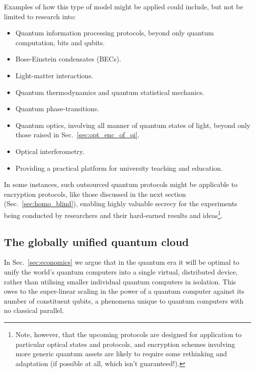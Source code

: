 Examples of how this type of model might be applied could include, but not be limited to research into:
\begin{itemize}
	\item Quantum information processing protocols, beyond only quantum computation, bits and qubits.
	\item Bose-Einstein condensates (BECs).
	\item Light-matter interactions.
	\item Quantum thermodynamics and quantum statistical mechanics.
	\item Quantum phase-transitions.
	\item Quantum optics, involving all manner of quantum states of light, beyond only those raised in Sec.~\ref{sec:opt_enc_of_qi}.
	\item Optical interferometry.
	\item Providing a practical platform for university teaching and education.
\end{itemize}

In some instances, such outsourced quantum protocols might be applicable to encryption protocols, like those discussed in the next section (Sec.~\ref{sec:homo_blind}), enabling highly valuable secrecy for the experiments being conducted by researchers and their hard-earned results and ideas\footnote{Note, however, that the upcoming protocols are designed for application to particular optical states and protocols, and encryption schemes involving more generic quantum assets are likely to require some rethinking and adaptation (if possible at all, which isn't guaranteed!).}.

%
%

\subsection{The globally unified quantum cloud}\label{sec:glob_unif_quant_cloud}

In Sec.~\ref{sec:economics} we argue that in the quantum era it will be optimal to unify the world's quantum computers into a single virtual, distributed device, rather than utilising smaller individual quantum computers in isolation. This owes to the super-linear scaling in the power of a quantum computer against its number of constituent qubits, a phenomena unique to quantum computers with no classical parallel.

